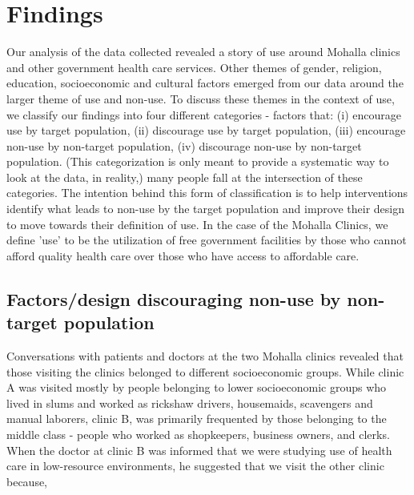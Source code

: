 \section{Findings}
\textcolor{red}{}
Our analysis of the data collected revealed a story of use around Mohalla clinics and other government health care services. Other themes of gender, religion, education, socioeconomic and cultural factors emerged from our data around the larger theme of use and non-use. 
To discuss these themes in the context of use, we classify our findings into four different categories - factors that: (i) encourage use by target population, (ii) discourage use by target population, (iii) encourage non-use by non-target population, (iv) discourage non-use by non-target population. (This categorization is only meant to provide a systematic way to look at the data, in reality,) many people fall at the intersection of these categories. The intention behind this form of classification is to help interventions identify what leads to non-use by the target population and improve their design to move towards their definition of use. In the case of the Mohalla Clinics, we define 'use' to be the utilization of free government facilities by those who cannot afford quality health care over those who have access to affordable care.

\subsection{Factors/design discouraging non-use by non-target population}
Conversations with patients and doctors at the two Mohalla clinics revealed that those visiting the clinics belonged to different socioeconomic groups. While clinic A was visited mostly by people belonging to lower socioeconomic groups who lived in slums and worked as rickshaw drivers, housemaids, scavengers and manual laborers, clinic B, was primarily frequented by those belonging to the middle class - people who worked as shopkeepers, business owners, and clerks. When the doctor at clinic B was informed that we were studying use of health care in low-resource environments, he suggested that we visit the other clinic because,

